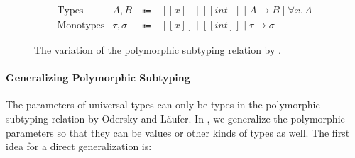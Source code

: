 \begin{figure}
\centering
\begin{equation*}
\begin{array}{llcl}
  \text{Types} & A, B & ~\Coloneqq~ & [[x]] \mid [[int]] \mid A \rightarrow B \mid \forall x.\, A \\
  \text{Monotypes} & \tau, \sigma & ~\Coloneqq~ & [[x]] \mid [[int]] \mid \tau \rightarrow \sigma
\end{array}
\end{equation*}

\caption{The \cite{dunfield2013complete} variation of the polymorphic subtyping relation by \cite{odersky1996putting}.}
\label{fig:polymorphic-subtyping}
\end{figure}

\paragraph{Generalizing Polymorphic Subtyping}
\label{sec:polymorphic-subtyping}

The parameters of universal types can only be types in the polymorphic
subtyping relation by Odersky and L\"aufer.
In \name, we generalize the polymorphic parameters so that they can
be values or other kinds of types as well.
The first idea for a direct generalization is:


